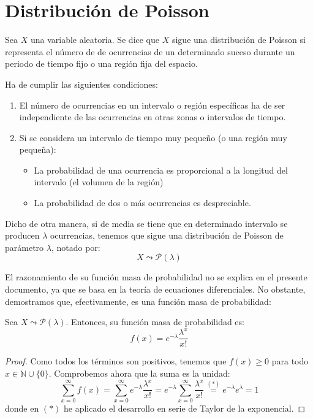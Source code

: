 \section{Distribución de Poisson}

\begin{definicion}
    Sea $X$ una variable aleatoria. Se dice que $X$ sigue una distribución de Poisson si representa el número de de ocurrencias de un determinado suceso durante un periodo de tiempo fijo o una región fija del espacio.

    Ha de cumplir las siguientes condiciones:
    \begin{enumerate}
        \item El número de ocurrencias en un intervalo o región específicas ha de ser independiente de las ocurrencias en otras zonas o intervalos de tiempo.

        \item Si se considera un intervalo de tiempo muy pequeño (o una región muy pequeña):
        \begin{itemize}
            \item La probabilidad de una ocurrencia es proporcional a la longitud del intervalo (el volumen de la región)
            \item La probabilidad de dos o más ocurrencias es despreciable.
        \end{itemize}
    \end{enumerate}

    Dicho de otra manera, si de media se tiene que en determinado intervalo se producen $\lambda$ ocurrencias, tenemos que sigue una distribución de Poisson de parámetro $\lambda$, notado por:
    \begin{equation*}
        X\leadsto \mathcal{P}(\lambda)
    \end{equation*}
\end{definicion}

El razonamiento de su función masa de probabilidad no se explica en el presente documento, ya que se basa en la teoría de ecuaciones diferenciales. No obstante, demostramos que, efectivamente, es una función masa de probabilidad:
\begin{prop} Sea $X\leadsto \mathcal{P}(\lambda)$. Entonces, su función masa de probabilidad es:
    \begin{equation*}
        f(x)=e^{-\lambda}\frac{\lambda^x}{x!}
    \end{equation*}
\end{prop}
\begin{proof}
    Como todos los términos son positivos, tenemos que $f(x)\geq 0$ para todo $x\in \mathbb{N}\cup \{0\}$. Comprobemos ahora que la suma es la unidad:
    \begin{equation*}
        \sum_{x=0}^\infty f(x)
        = \sum_{x=0}^\infty e^{-\lambda}\frac{\lambda^x}{x!}
        = e^{-\lambda}\sum_{x=0}^\infty \frac{\lambda^x}{x!}
        \stackrel{(\ast)}{=} e^{-\lambda}e^\lambda = 1
    \end{equation*}
    donde en $(\ast)$ he aplicado el desarrollo en serie de Taylor de la exponencial.
\end{proof}


